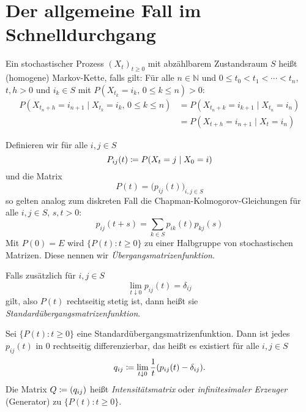 \documentclass[a4paper,twoside,DIV15,BCOR12mm]{scrbook}
\begin{document}
\section{Der allgemeine Fall im Schnelldurchgang}

\begin{definition}
Ein stochastischer Prozess $(X_t)_{t\ge 0}$ mit abzählbarem Zustandsraum $S$ heißt (homogene) Markov-Kette, falls gilt:
Für alle $n\in\mathbb N$ und $0\le t_0 < t_1 < \cdots < t_n$, $t,h>0$ und $i_k\in S$ mit $P(X_{t_k}=i_k,\, 0\le k\le n) > 0$:
\begin{align*}
P(X_{t_n+h}=i_{n+1} \mid X_{t_k}=i_k,\, 0\le k\le n) &= P(X_{t_n+k} = i_{k+1} \mid X_{t_n} = i_n) \\ 
&= P(X_{t+h} = i_{n+1} \mid X_t=i_n)
\end{align*}
\end{definition}

\begin{bemerkung}
Definieren wir für alle $i,j\in S$
\[
P_{ij}(t) \da P(X_t = j \mid X_0 = i)
\]
und die Matrix
\[
P(t) = \big(p_{ij}(t)\big)_{i,j\in S}
\]
so gelten analog zum diskreten Fall die Chapman-Kolmogorov-Gleichungen für alle $i,j\in S$, $s,t>0$:
\[
p_{ij}(t+s) = \sum_{k\in S} p_{ik}(t) p_{kj}(s)
\]
Mit $P(0)=E$ wird $\{P(t): t\ge 0\}$ zu einer Halbgruppe von stochastischen Matrizen. Diese nennen wir \emph{Übergangsmatrizenfunktion}.

Falls zusätzlich für $i,j\in S$ 
\[
\lim_{t\downarrow 0} p_{ij}(t)=\delta_{ij}
\]
gilt, also $P(t)$ rechtseitig stetig ist, dann heißt sie \emph{Standardübergangsmatrizenfunktion}.
\end{bemerkung}


\begin{satzunddefinition}
Sei $\{P(t): t\ge 0\}$ eine Standardübergangsmatrizenfunktion. Dann ist jedes $p_{ij}(t)$ in 0 rechtseitig differenzierbar, das heißt es existiert für alle $i,j\in S$
\[
q_{ij} \da \lim_{t\downarrow 0} \frac 1t (p_{ij}(t) - \delta_{ij}).
\]
Die Matrix $Q\da (q_{ij})$ heißt \emph{Intensitätsmatrix} oder \emph{infinitesimaler Erzeuger} (Generator) zu $\{P(t): t\ge 0\}$.
\end{satzunddefinition}
\end{document}
